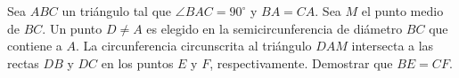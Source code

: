 Sea $ABC$ un triángulo tal que $\angle BAC = 90^{\circ}$ y $BA = CA$. Sea $M$ el punto medio de $BC$. Un punto $D \neq A$ es elegido en la semicircunferencia de diámetro $BC$ que contiene a $A$. La circunferencia circunscrita al triángulo $DAM$ intersecta a las rectas $DB$ y $DC$ en los puntos $E$ y $F$, respectivamente. Demostrar que $BE = CF$.